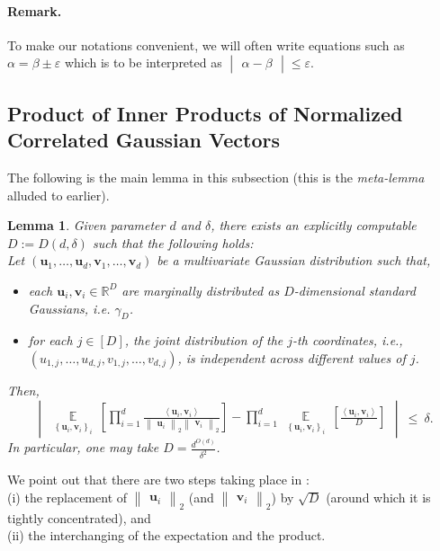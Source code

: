 \documentclass[11pt]{article}
\newcommand{\inbrace}[1]{\left \{ #1 \right \}}
\newcommand{\insquare}[1]{\left [ #1 \right ]}
\newcommand{\inangle}[1]{\left \langle #1 \right \rangle}
\newcommand{\inabs}[1]{\begin{vmatrix} #1 \end{vmatrix}}
\newcommand{\norm}[2]{\begin{Vmatrix} #2 \end{Vmatrix}_{#1}}
\newcommand{\set}[1]{\inbrace{#1}}
\DeclareMathOperator*{\Ex}{\mathbb{E}}
\newcommand{\eps}{\varepsilon}
\newcommand{\bbR}{{\mathbb R}}
\newcommand{\bu}{{\bm u}}
\newcommand{\bv}{{\bm v}}
\newtheorem{lem}[theorem]{Lemma}
\begin{document}
\paragraph{Remark.} To make our notations convenient, we will often write equations such as $\alpha = \beta \pm \eps$ which is to be interpreted as $\inabs{\alpha - \beta} \le \eps$.

\subsection{Product of Inner Products of Normalized Correlated Gaussian Vectors}\label{subsec:meta-lemma}


The following is the main lemma in this subsection (this is the {\em meta-lemma} alluded to earlier).
\begin{lem}\label{le:norm_Gauss}
	Given parameter $d$ and $\delta$, there exists an explicitly computable $D := D(d, \delta)$ such that the following holds:\\
	Let $(\bu_1,\ldots,\bu_d, \bv_1,\ldots, \bv_d)$ be a multivariate Gaussian distribution such that,
	\begin{itemize}
	\item each $\bu_i,\bv_i \in \bbR^D$ are marginally distributed as $D$-dimensional standard Gaussians, i.e. $\gamma_D$.
	\item for each $j \in [D]$, the joint distribution of the $j$-th coordinates, i.e., $(u_{1,j}, \ldots, u_{d,j}, v_{1,j}, \ldots, v_{d,j})$, is independent across different values of $j$.
	\end{itemize}
	Then,
	$$\inabs{\Ex\limits_{\set{\bu_i, \bv_i}_i} \ \insquare{\prod_{i=1}^d \frac{\inangle{\bu_i, \bv_i}}{\norm{2}{\bu_i} \norm{2}{\bv_i}}} - \prod_{i=1}^d \ \Ex\limits_{\set{\bu_i, \bv_i}_i} \ \insquare{\frac{\inangle{\bu_i, \bv_i}}{D}}} ~\le~ \delta.$$
	In particular, one may take $D = \frac{d^{O(d)}}{\delta^2}$.
\end{lem}
\noindent We point out that there are two steps taking place in :\\
(i) the replacement of $\norm{2}{\bu_i}$ (and $\norm{2}{\bv_i}$) by $\sqrt{D}$ (around which it is tightly concentrated), and\\
(ii) the interchanging of the expectation and the product.\\
\end{document}
